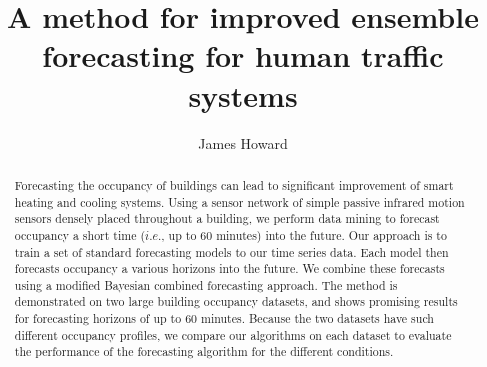 \documentclass[letterpaper,12pt]{article}
\title{A method for improved ensemble forecasting for human traffic systems}
\author{James Howard}
\begin{document}
\frontmatter

\maketitle
\newpage

\makecopyright{\the\year}
\newpage


\makesubmittal
\newpage

\begin{abstract}
Forecasting the occupancy of buildings can lead to significant improvement of smart heating and cooling systems. Using a sensor network of simple passive infrared motion sensors densely placed throughout a building, we perform data mining to forecast occupancy a short time ($i.e.$, up to 60 minutes) into the future.  Our approach is to train a set of standard forecasting models to our time series data.  Each model then forecasts occupancy a various horizons into the future.  We combine these forecasts using a modified Bayesian combined forecasting approach.  The method is demonstrated on two large building occupancy datasets, and shows promising results for forecasting horizons of up to 60 minutes.  Because the two datasets have such different occupancy profiles, we compare our algorithms on each dataset to evaluate the performance of the forecasting algorithm for the different conditions.
\end{abstract}

\newpage


\tableofcontents
\newpage


\listoffiguresandtables
\newpage


\newpage

\listofabbreviations*
\newpage
\end{document}
